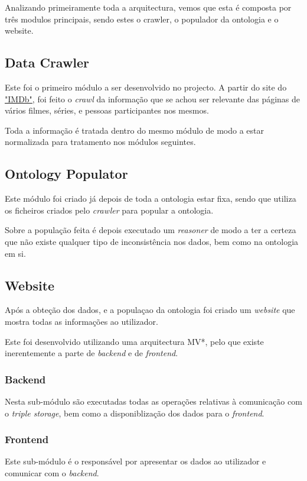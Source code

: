 \documentclass[a4paper]{article}
\begin{document}
Analizando primeiramente toda a arquitectura, vemos que esta é composta por três modulos principais, sendo estes o crawler, o populador da ontologia e o website.

\subsection{Data Crawler}
\indent \indent Este foi o primeiro módulo a ser desenvolvido no projecto. A partir do site do \hyperref[www.imdb.com]{"IMDb"}, foi feito o \textit{crawl} da informação que se achou ser relevante das páginas de vários filmes, séries, e pessoas participantes nos mesmos.
 
Toda a informação é tratada dentro do mesmo módulo de modo a estar normalizada para tratamento nos módulos seguintes.

\subsection{Ontology Populator}
\indent \indent Este módulo foi criado já depois de toda a ontologia estar fixa, sendo que utiliza os ficheiros criados pelo \textit{crawler} para popular a ontologia.

Sobre a população feita é depois executado um \textit{reasoner} de modo a ter a certeza que não existe qualquer tipo de inconsistência nos dados, bem como na ontologia em si.

\subsection{Website}
\indent \indent Após a obteção dos dados, e a populaçao da ontologia foi criado um \textit{website} que mostra todas as informações ao utilizador.

Este foi desenvolvido utilizando uma arquitectura MV*, pelo que existe inerentemente a parte de \textit{backend} e de \textit{frontend}.

\subsubsection{Backend}
\indent \indent Nesta sub-módulo são executadas todas as operações relativas à comunicação com o \textit{triple storage}, bem como a disponiblização dos dados para o \textit{frontend}.

\subsubsection{Frontend}
\indent \indent Este sub-módulo é o responsável por apresentar os dados ao utilizador e comunicar com o \textit{backend}.
\end{document}
